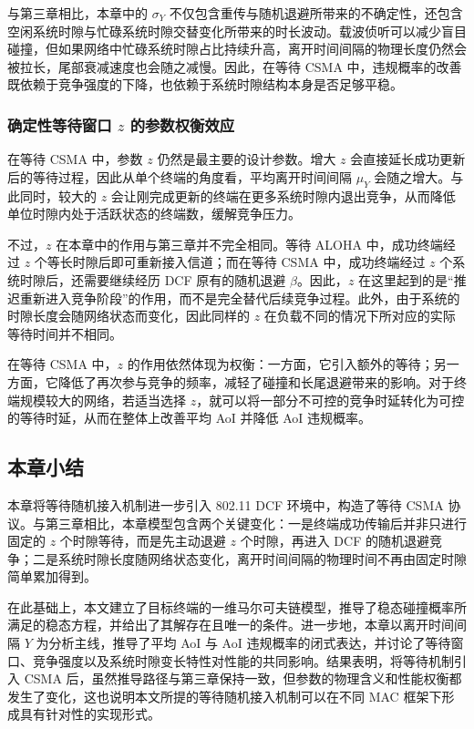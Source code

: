 与第三章相比，本章中的 $\sigma_Y$ 不仅包含重传与随机退避所带来的不确定性，还包含空闲系统时隙与忙碌系统时隙交替变化所带来的时长波动。载波侦听可以减少盲目碰撞，但如果网络中忙碌系统时隙占比持续升高，离开时间间隔的物理长度仍然会被拉长，尾部衰减速度也会随之减慢。因此，在等待 CSMA 中，违规概率的改善既依赖于竞争强度的下降，也依赖于系统时隙结构本身是否足够平稳。

\subsubsection{确定性等待窗口 \texorpdfstring{$z$}{z} 的参数权衡效应}

在等待 CSMA 中，参数 $z$ 仍然是最主要的设计参数。增大 $z$ 会直接延长成功更新后的等待过程，因此从单个终端的角度看，平均离开时间间隔 $\mu_Y$ 会随之增大。与此同时，较大的 $z$ 会让刚完成更新的终端在更多系统时隙内退出竞争，从而降低单位时隙内处于活跃状态的终端数，缓解竞争压力。

不过，$z$ 在本章中的作用与第三章并不完全相同。等待 ALOHA 中，成功终端经过 $z$ 个等长时隙后即可重新接入信道；而在等待 CSMA 中，成功终端经过 $z$ 个系统时隙后，还需要继续经历 DCF 原有的随机退避 $\beta$。因此，$z$ 在这里起到的是“推迟重新进入竞争阶段”的作用，而不是完全替代后续竞争过程。此外，由于系统的时隙长度会随网络状态而变化，因此同样的 $z$ 在负载不同的情况下所对应的实际等待时间并不相同。

在等待 CSMA 中，$z$ 的作用依然体现为权衡：一方面，它引入额外的等待；另一方面，它降低了再次参与竞争的频率，减轻了碰撞和长尾退避带来的影响。对于终端规模较大的网络，若适当选择 $z$，就可以将一部分不可控的竞争时延转化为可控的等待时延，从而在整体上改善平均 AoI 并降低 AoI 违规概率。

\subsection{本章小结}

本章将等待随机接入机制进一步引入 802.11 DCF 环境中，构造了等待 CSMA 协议。与第三章相比，本章模型包含两个关键变化：一是终端成功传输后并非只进行固定的 $z$ 个时隙等待，而是先主动退避 $z$ 个时隙，再进入 DCF 的随机退避竞争；二是系统时隙长度随网络状态变化，离开时间间隔的物理时间不再由固定时隙简单累加得到。

在此基础上，本文建立了目标终端的一维马尔可夫链模型，推导了稳态碰撞概率所满足的稳态方程，并给出了其解存在且唯一的条件。进一步地，本章以离开时间间隔 $Y$ 为分析主线，推导了平均 AoI 与 AoI 违规概率的闭式表达，并讨论了等待窗口、竞争强度以及系统时隙变长特性对性能的共同影响。结果表明，将等待机制引入 CSMA 后，虽然推导路径与第三章保持一致，但参数的物理含义和性能权衡都发生了变化，这也说明本文所提的等待随机接入机制可以在不同 MAC 框架下形成具有针对性的实现形式。
